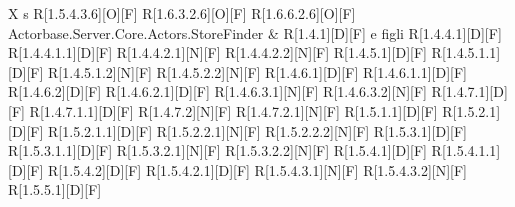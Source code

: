 \begin{longtable}{X s}
		R[1.5.4.3.6][O][F] \newline R[1.6.3.2.6][O][F] \newline R[1.6.6.2.6][O][F]
	\\
	\hline
	Actorbase.Server.Core.Actors.StoreFinder & R[1.4.1][D][F] e figli \newline R[1.4.4.1][D][F] \newline
		R[1.4.4.1.1][D][F] \newline R[1.4.4.2.1][N][F] \newline R[1.4.4.2.2][N][F] \newline
		R[1.4.5.1][D][F] \newline R[1.4.5.1.1][D][F] \newline R[1.4.5.1.2][N][F] \newline 
		R[1.4.5.2.2][N][F] \newline R[1.4.6.1][D][F] \newline R[1.4.6.1.1][D][F] \newline 
		R[1.4.6.2][D][F] \newline R[1.4.6.2.1][D][F] \newline R[1.4.6.3.1][N][F] \newline 
		R[1.4.6.3.2][N][F] \newline R[1.4.7.1][D][F] \newline R[1.4.7.1.1][D][F] \newline 
		R[1.4.7.2][N][F] \newline R[1.4.7.2.1][N][F] \newline R[1.5.1.1][D][F] \newline
		R[1.5.2.1][D][F] \newline R[1.5.2.1.1][D][F] \newline R[1.5.2.2.1][N][F] \newline
		R[1.5.2.2.2][N][F] \newline R[1.5.3.1][D][F] \newline R[1.5.3.1.1][D][F] \newline 
		R[1.5.3.2.1][N][F] \newline R[1.5.3.2.2][N][F] \newline R[1.5.4.1][D][F] \newline 
		R[1.5.4.1.1][D][F] \newline R[1.5.4.2][D][F] \newline R[1.5.4.2.1][D][F] \newline 
		R[1.5.4.3.1][N][F] \newline R[1.5.4.3.2][N][F] \newline R[1.5.5.1][D][F] \newline

\end{longtable}

